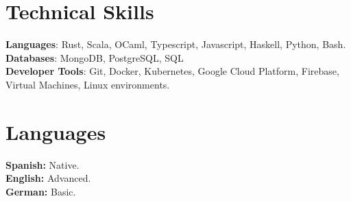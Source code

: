 \documentclass[letterpaper,11pt]{article}
\begin{document}
%
\section{Technical Skills}
 \begin{itemize}[leftmargin=0.15in, label={}]
    \small{\item{
     \textbf{Languages}{: Rust, Scala, OCaml, Typescript, Javascript, Haskell, Python, Bash.} \\
     \textbf{Databases}{: MongoDB, PostgreSQL, SQL} \\
     \textbf{Developer Tools}{: Git, Docker, Kubernetes, Google Cloud Platform, Firebase, Virtual Machines, Linux environments.} \\
    }}
 \end{itemize}

\section{Languages}
 \begin{itemize}[leftmargin=0.15in, label={}]
    \small{\item{
     \textbf{Spanish: }{Native.} \\
     \textbf{English: }{Advanced.} \\
     \textbf{German: }{Basic.} \\
    }}
 \end{itemize}


\end{document}
